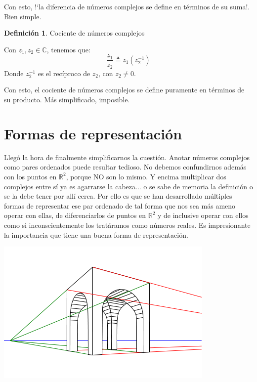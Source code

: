 \documentclass[12pt]{article}
\theoremstyle{definition}
\newtheorem{definition}{Definici\'on}[section]
\begin{document}
	Con esto, !`la diferencia de n\'umeros complejos se define en t\'erminos de su suma!. Bien simple.\\
  
  \colorbox{red!40!white!80}{\parbox{\linewidth}{
 	\theoremstyle{definition}
 	\begin{definition}{Cociente de n\'umeros complejos}

	   Con $z_1, z_2 \in \mathbb{C}$, tenemos que: $$\frac{z_1}{z_2} \triangleq z_1(z_2^{-1})$$
	   Donde $z_2^{-1}$ es el rec\'iproco de $z_2$, con $z_2 \neq 0$.
	 
 	\end{definition}}}
 	\linebreak
 
	Con esto, el cociente de n\'umeros complejos se define puramente en t\'erminos de su producto. M\'as simplificado, imposible.\\
  
\section{Formas de representaci\'on}
Lleg\'o la hora de finalmente simplificarnos la cuesti\'on. Anotar n\'umeros complejos como pares ordenados puede resultar tedioso. No debemos confundirnos adem\'as con los puntos en $\mathbb{R}^2$, porque NO son lo mismo. Y encima multiplicar dos complejos entre s\'i ya es agarrarse la cabeza... o se sabe de memoria la definici\'on o se la debe tener por all\'i cerca. Por ello es que se han desarrollado m\'ultiples formas de representar ese par ordenado de tal forma que nos sea m\'as ameno operar con ellas, de diferenciarlos de puntos en $\mathbb{R}^2$ y de inclusive operar con ellos como si inconscientemente los trat\'aramos como n\'umeros reales. Es impresionante la importancia que tiene una buena forma de representaci\'on.

\begin{center}
	\includegraphics[scale=0.5]{Perspectiva.png}
\end{center}
 
\end{document}
